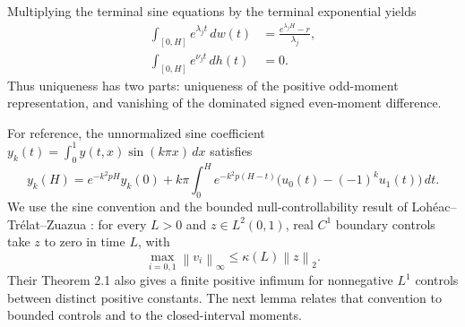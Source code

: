 \documentclass[11pt]{article}
\theoremstyle{remark}
\newcommand{\norm}[1]{\left\lVert #1\right\rVert}
\begin{document}
Multiplying the terminal sine equations by the terminal exponential yields
\begin{align}
 \int_{[0,H]}e^{\lambda_jt}\,dw(t)
   &=\frac{e^{\lambda_jH}-r}{\lambda_j},\label{eq:odd}\\
 \int_{[0,H]}e^{\nu_jt}\,dh(t)&=0.\label{eq:even}
\end{align}
Thus uniqueness has two parts: uniqueness of the positive odd-moment
representation, and vanishing of the dominated signed even-moment difference.

For reference, the unnormalized sine coefficient
$y_k(t)=\int_0^1y(t,x)\sin(k\pi x)\,dx$ satisfies
\begin{equation}\label{eq:sine}
 y_k(H)=e^{-k^2pH}y_k(0)+k\pi
 \int_0^H e^{-k^2p(H-t)}\bigl(u_0(t)-(-1)^ku_1(t)\bigr)\,dt.
\end{equation}
We use the sine convention and the bounded null-controllability result of
Loh\'eac--Tr\'elat--Zuazua \cite[Section 2.2 and Lemma 2.1]{LTZ2017}:
for every $L>0$ and $z\in L^2(0,1)$, real $C^1$ boundary controls take $z$
to zero in time $L$, with
\begin{equation}\label{eq:nullbound}
 \max_{i=0,1}\norm{v_i}_{\infty}\le\kappa(L)\norm{z}_2.
\end{equation}
Their Theorem 2.1 also gives a finite positive infimum for nonnegative
$L^1$ controls between distinct positive constants. The next lemma relates
that convention to bounded controls and to the closed-interval moments.
\end{document}
